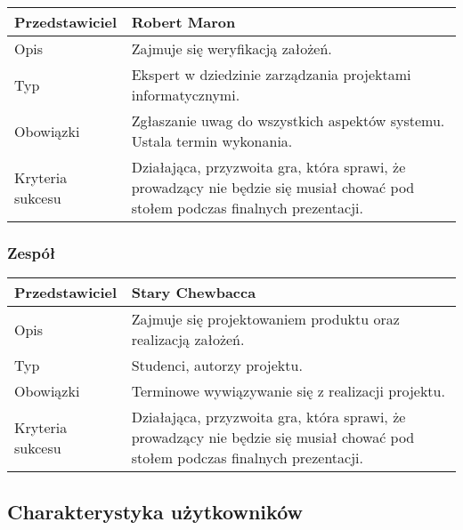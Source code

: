 \documentclass[12pt,a4paper,twoside]{article}
\begin{document}
\begin{longtable}{|p{1in}|p{4in}|}
\hline
Przedstawiciel &
Robert Maron\\

\hline
Opis &
Zajmuje się weryfikacją założeń.\\

\hline
Typ &
Ekspert w dziedzinie zarządzania projektami informatycznymi.\\

\hline
Obowiązki&
Zgłaszanie uwag do wszystkich aspektów systemu. Ustala termin wykonania.\\

\hline
Kryteria sukcesu &
Działająca, przyzwoita gra, która sprawi, że prowadzący nie będzie się musiał chować pod stołem podczas finalnych prezentacji.\\

\hline
\end{longtable}

\subsubsection{Zespół}

\begin{longtable}{|p{1in}|p{4in}|}
\hline
Przedstawiciel &
Stary Chewbacca\\

\hline
Opis &
Zajmuje się projektowaniem produktu oraz realizacją założeń.\\

\hline
Typ &
Studenci, autorzy projektu.\\

\hline
Obowiązki&
Terminowe wywiązywanie się z realizacji projektu.\\

\hline
Kryteria sukcesu &
Działająca, przyzwoita gra, która sprawi, że prowadzący nie będzie się musiał chować pod stołem podczas finalnych prezentacji.\\

\hline
\end{longtable}

\subsection{Charakterystyka użytkowników}

\end{document}
